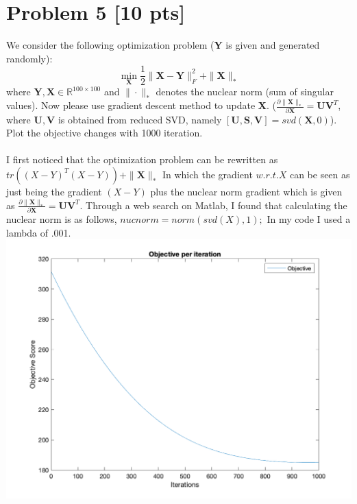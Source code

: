 \documentclass[11pt]{article}
\newcommand{\R}{\mathbb{R}}
\newcommand{\mtx}[1]{\mathbf{#1}}
\def \mU {\mtx{U}}
\def \mS {\mtx{S}}
\def \mV {\mtx{V}}
\def \mX {\mtx{X}}
\def \mY {\mtx{Y}}
\def \R {\mathbb{R}}
\begin{document}
\section*{Problem 5 [10 pts]}
We consider the following optimization problem ($\mY$ is given and generated randomly):
\begin{equation}
	\min_{\mX} \frac{1}{2}\|\mX-\mY\|^2_F + \|\mX\|_*
\end{equation}
where $\mY,\mX\in\R^{100\times100}$ and $\|\cdot\|_*$ denotes the nuclear norm (sum of singular values). Now please use gradient descent method to update $\mX$. ($\frac{\partial \|\mX\|_*}{\partial \mX}=\mU\mV^T$, where $\mU,\mV$ is obtained from reduced SVD, namely $[\mU,\mS,\mV]=svd(\mX,0)$). Plot the objective changes with 1000 iteration.\\\\
I first noticed that the optimization problem can be rewritten as $tr((X - Y)^T(X - Y))+ \|\mX\|_*$ In which the gradient $w.r.t. X$ can be seen as just being the gradient $(X - Y)$ plus the nuclear norm gradient which is given as $\frac{\partial \|\mX\|_*}{\partial \mX}=\mU\mV^T$. Through a web search on Matlab, I found that calculating the nuclear norm is as follows, $nucnorm = norm(svd(X),1);$ In my code I used a lambda of .001.\\
\includegraphics[scale=1]{ob_min.png}

\newpage
\end{document}
